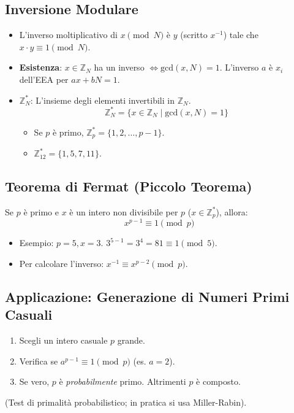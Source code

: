 \subsection{Inversione Modulare}
\begin{itemize}
    \item L'inverso moltiplicativo di $x \pmod N$ è $y$ (scritto $x^{-1}$) tale che $x \cdot y \equiv 1 \pmod N$.
    \item \textbf{Esistenza}: $x \in \mathbb{Z}_N$ ha un inverso $\iff \text{gcd}(x, N) = 1$.
    L'inverso $a$ è $x_i$ dell'EEA per $ax+bN=1$.
    \item \textbf{$\mathbb{Z}_N^*$}: L'insieme degli elementi invertibili in $\mathbb{Z}_N$.
    \[ \mathbb{Z}_N^* = \{x \in \mathbb{Z}_N \mid \text{gcd}(x,N) = 1 \} \]
    \begin{itemize}
        \item Se $p$ è primo, $\mathbb{Z}_p^* = \{1, 2, \dots, p-1\}$.
        \item $\mathbb{Z}_{12}^* = \{1, 5, 7, 11\}$.
    \end{itemize}
\end{itemize}

\subsection{Teorema di Fermat (Piccolo Teorema)}
Se $p$ è primo e $x$ è un intero non divisibile per $p$ ($x \in \mathbb{Z}_p^*$), allora:
\[ x^{p-1} \equiv 1 \pmod p \]
\begin{itemize}
    \item Esempio: $p=5, x=3$. $3^{5-1} = 3^4 = 81 \equiv 1 \pmod 5$.
    \item Per calcolare l'inverso: $x^{-1} \equiv x^{p-2} \pmod p$.
\end{itemize}

\subsection{Applicazione: Generazione di Numeri Primi Casuali}
\begin{enumerate}
    \item Scegli un intero casuale $p$ grande.
    \item Verifica se $a^{p-1} \equiv 1 \pmod p$ (es. $a=2$).
    \item Se vero, $p$ è \textit{probabilmente} primo. Altrimenti $p$ è composto.
\end{enumerate}
(Test di primalità probabilistico; in pratica si usa Miller-Rabin).

